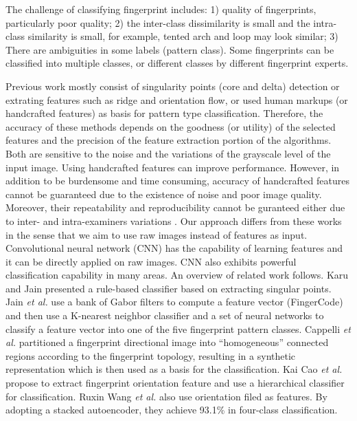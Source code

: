 
The challenge of classifying fingerprint includes: 
%
1) quality of fingerprints, particularly poor quality; 
%
2) the inter-class dissimilarity is small and the intra-class similarity is small, for example, tented arch and loop may look similar; 
%
3) There are ambiguities in some labels (pattern class). Some fingerprints can be classified into multiple classes, or different classes by different fingerprint experts.

Previous work mostly consist of singularity points (core and delta) detection or extrating features such as ridge and orientation flow, or used human markups (or handcrafted features) as basis for pattern type classification. Therefore, the accuracy of these methods depends on the goodness (or utility) of the selected features and the precision of the feature extraction portion of the algorithms. Both are sensitive to the noise and the variations of the grayscale level of the input image.  Using handcrafted features can improve performance.  However, in addition to be burdensome and time consuming, accuracy of handcrafted features cannot be guaranteed due to the existence of noise and poor image quality. Moreover, their repeatability and reproducibility cannot be guranteed either due to inter- and intra-examiners variations \cite{fbiBlackbox}.  
%
Our approach differs from these works in the sense that we aim to use raw images instead of features as input. Convolutional neural network (CNN) has the capability of learning features and it can be directly applied on raw images. CNN also exhibits powerful classification capability in many areas\cite{lecun2015deep}\cite{szegedy2016rethinking}.
%
An overview of related work follows. 
%
Karu and Jain \cite{karuJain1996} presented a rule-based classifier based on extracting singular points. 
%
Jain \textit{et al.} \cite{JainSalil1999} use a bank of Gabor filters to compute a feature vector (FingerCode) and then use a K-nearest neighbor classifier and a set of neural networks to classify a feature vector into one of the five fingerprint pattern classes.
%
Cappelli \textit{et al.} \cite{cappelli1999} partitioned a fingerprint directional image into ``homogeneous'' connected regions according to the fingerprint topology, resulting in a synthetic representation which is then used as a basis for the classification.
%
Kai Cao \textit{et al.}\cite{cao2013fingerprint} propose to extract fingerprint orientation feature and use a hierarchical classifier for classification.
%
Ruxin Wang \textit{et al.} \cite{wang2014fingerprint} also use orientation filed as features. By adopting a stacked autoencoder, they achieve 93.1\% in four-class classification.
 
